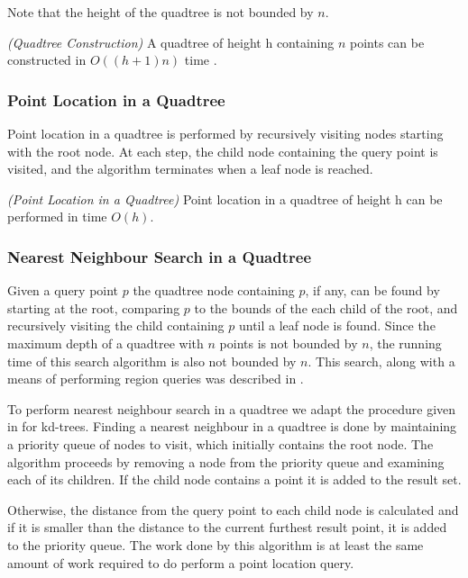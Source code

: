 \documentclass[mcs]{scsthesis}
\begin{document}
Note that the height of the quadtree is not bounded by $n$.

\begin{thm} \emph{(Quadtree Construction)}
A quadtree of height h containing $n$ points can be constructed in \(O((h + 1)n)\)
time \cite{dutch}.
\end{thm}

\subsubsection{Point Location in a Quadtree}

Point location in a quadtree is performed by recursively visiting nodes
starting with the root node. At each step, the child node containing the query
point is visited, and the algorithm terminates when a leaf node is reached.

\begin{thm} \emph{(Point Location in a Quadtree)} 
Point location in a quadtree of height h can be performed in time \(O(h)\). 
\end{thm}

\subsubsection{Nearest Neighbour Search in a Quadtree}

Given a query point $p$ the quadtree node containing $p$, if any, can be found by
starting at the root, comparing $p$ to the bounds of the each child of the root,
and recursively visiting the child containing $p$ until a leaf node is found.  
Since the maximum depth of a quadtree with $n$ points is not bounded by $n$, the
running time of this search algorithm is also not bounded by $n$. This search,
along with a means of performing region queries was described in
\cite{quadtree}.

To perform nearest neighbour search in a quadtree we adapt the procedure given
in \cite{samet} for kd-trees. Finding a nearest neighbour in a quadtree is done
by maintaining a priority queue of nodes to visit, which initially contains the
root node. The algorithm proceeds by removing a node from the priority queue and
examining each of its children. If the child node contains a point it is added
to the result set.

Otherwise, the distance from the query point to each child node is calculated
and if it is smaller than the distance to the current furthest result point,
it is added to the priority queue. The work done by this algorithm is at
least the same amount of work required to do perform a point location query.
\end{document}
